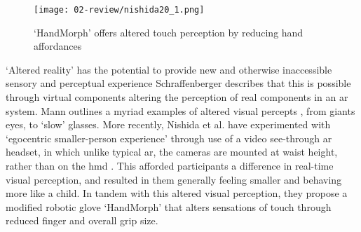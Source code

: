 \begin{wrapfigure}{l}{0.45\textwidth}
    \begin{minipage}{0.95\linewidth}
        \texttt{[image: 02-review/nishida20\_1.png]}
        \captionsetup{justification=justified}
        \caption{`HandMorph' offers altered touch perception by reducing hand affordances \citep[in][]{nishida2020}}\label{fig: handmorph}
    \end{minipage}
    \hfill
\end{wrapfigure}
`Altered reality' has the potential to provide new and otherwise inaccessible sensory and perceptual experience Schraffenberger describes that this is possible through virtual components altering the perception of real components in an \gls{ar} system. Mann outlines a myriad examples of altered visual percepts \citeyearpar{mann1994}, from giants eyes, to `slow' glasses. More recently, Nishida et al. have experimented with `egocentric smaller-person experience' through use of a video see-through \gls{ar} headset, in which unlike typical \gls{ar}, the cameras are mounted at waist height, rather than on the \gls{hmd} \citeyearpar{nishida2019}. This afforded participants a difference in real-time visual perception, and resulted in them generally feeling smaller and behaving more like a child. In tandem with this altered visual perception, they propose a modified robotic glove `HandMorph' \citeyearpar{nishida2020} that alters sensations of touch through reduced finger and overall grip size. 

